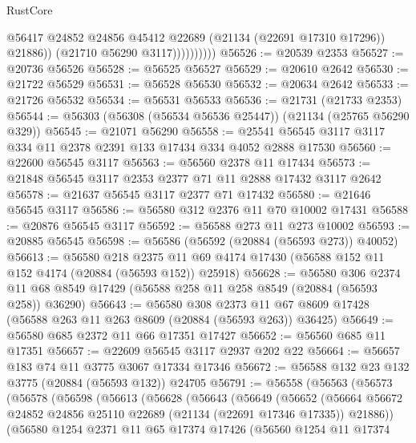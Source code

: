 \begin{lexlean}{RustCore}
\begin{coremodule}
                          @56417
                          @24852
                          @24856
                          @45412
                          @22689
                          (@21134 (@22691 @17310 @17296))
                          @21886))
                      (@21710 @56290 @3117))))))))))
@56526 := @20539 @2353
@56527 := @20736 @56526
@56528 := @56525 @56527
@56529 := @20610 @2642
@56530 := @21722 @56529
@56531 := @56528 @56530
@56532 := @20634 @2642
@56533 := @21726 @56532
@56534 := @56531 @56533
@56536 := @21731 (@21733 @2353)
@56544 := @56303 (@56308 (@56534 @56536 @25447)) (@21134 (@25765 @56290 @329))
@56545 := @21071 @56290
@56558 := @25541 @56545 @3117 @3117 @334 @11 @2378 @2391 @133 @17434 @334 @4052 @2888 @17530
@56560 := @22600 @56545 @3117
@56563 := @56560 @2378 @11 @17434
@56573 := @21848 @56545 @3117 @2353 @2377 @71 @11 @2888 @17432 @3117 @2642
@56578 := @21637 @56545 @3117 @2377 @71 @17432
@56580 := @21646 @56545 @3117
@56586 := @56580 @312 @2376 @11 @70 @10002 @17431
@56588 := @20876 @56545 @3117
@56592 := @56588 @273 @11 @273 @10002
@56593 := @20885 @56545
@56598 := @56586 (@56592 (@20884 (@56593 @273)) @40052)
@56613 := @56580
    @218
    @2375
    @11
    @69
    @4174
    @17430
    (@56588 @152 @11 @152 @4174 (@20884 (@56593 @152)) @25918)
@56628 := @56580
    @306
    @2374
    @11
    @68
    @8549
    @17429
    (@56588 @258 @11 @258 @8549 (@20884 (@56593 @258)) @36290)
@56643 := @56580
    @308
    @2373
    @11
    @67
    @8609
    @17428
    (@56588 @263 @11 @263 @8609 (@20884 (@56593 @263)) @36425)
@56649 := @56580 @685 @2372 @11 @66 @17351 @17427
@56652 := @56560 @685 @11 @17351
@56657 := @22609 @56545 @3117 @2937 @202 @22
@56664 := @56657 @183 @74 @11 @3775 @3067 @17334 @17346
@56672 := @56588 @132 @23 @132 @3775 (@20884 (@56593 @132)) @24705
@56791 := @56558
    (@56563
      (@56573
        (@56578
          (@56598
            (@56613
              (@56628
                (@56643
                  (@56649
                    (@56652
                      (@56664
                        @56672
                        @24852
                        @24856
                        @25110
                        @22689
                        (@21134 (@22691 @17346 @17335))
                        @21886))
                    (@56580
                      @1254
                      @2371
                      @11
                      @65
                      @17374
                      @17426
                      (@56560
                        @1254
                        @11
                        @17374

\end{coremodule}
\end{lexlean}
